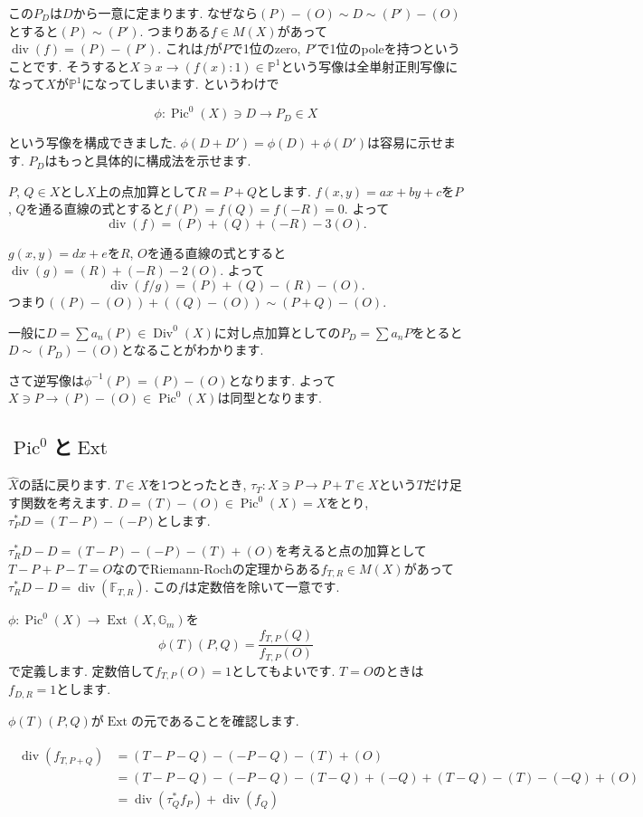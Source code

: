 \documentclass{jsarticle}
\newcommand{\FF}{\mathbb{F}}
\newcommand{\PP}{\mathbb{P}}
\newcommand{\GG}{\mathbb{G}}
\newcommand{\makeop}[1]{\mathop{\mathrm{#1}}\nolimits}
\def\Ext{\makeop{Ext}}
\def\Pic{\makeop{Pic}}
\def\Div{\makeop{Div}}
\def\div{\makeop{div}}
\theoremstyle{definition}
\numberwithin{theorem}{section}
\begin{document}
この$P_D$は$D$から一意に定まります. なぜなら$(P) - (O) \sim D \sim (P') - (O)$とすると$(P)\sim(P')$. つまりある$f\in M(X)$があって$\div(f) = (P) - (P')$. これは$f$が$P$で1位のzero, $P'$で1位のpoleを持つということです. そうすると$X \ni x \rightarrow (f(x):1) \in \PP^1$という写像は全単射正則写像になって$X$が$\PP^1$になってしまいます. というわけで

\begin{equation*}
\phi: \Pic^0(X) \ni D \rightarrow P_D \in X
\end{equation*}

という写像を構成できました. $\phi(D + D') = \phi(D) + \phi(D')$は容易に示せます. $P_D$はもっと具体的に構成法を示せます.

$P$, $Q \in X$とし$X$上の点加算として$R = P+Q$とします. $f(x, y) = ax+by+c$を$P$, $Q$を通る直線の式とすると$f(P) = f(Q) = f(-R) = 0$.
よって
\[
\div(f) = (P) + (Q) + (-R) - 3(O).
\]

$g(x, y) = dx+e$を$R$, $O$を通る直線の式とすると$\div(g) = (R) + (-R) - 2(O)$.
よって
\[
\div(f/g) = (P) + (Q) - (R) - (O).
\]
つまり$((P) - (O)) + ((Q) - (O)) \sim (P+Q) - (O)$.

一般に$D = \sum a_n(P) \in \Div^0(X)$に対し点加算としての$P_D = \sum a_n P$をとると$D \sim (P_D) - (O)$となることがわかります.

さて逆写像は$\phi^{-1}(P) = (P) - (O)$となります. よって$X \ni P \rightarrow (P) - (O) \in \Pic^0(X)$は同型となります.

\subsection{$\Pic^0$と$\Ext$}
$\hat{X}$の話に戻ります.
$T \in X$を1つとったとき, $\tau_T : X \ni P \rightarrow P+T \in X$という$T$だけ足す関数を考えます. $D = (T) - (O) \in \Pic^0(X) = X$をとり, $\tau_P^*D = (T-P) - (-P)$とします.

$\tau_R^*D - D = (T-P) - (-P) - (T) + (O)$を考えると点の加算として$T - P + P - T = O$なのでRiemann-Rochの定理からある$f_{T, R} \in M(X)$があって$\tau_R^*D - D = \div(\FF_{T, R})$.
この$f$は定数倍を除いて一意です.

$\phi: \Pic^0(X) \rightarrow \Ext(X, \GG_m)$を
\[
\phi(T)(P, Q) = \frac{f_{T, P}(Q)}{f_{T, P}(O)}
\]
で定義します. 定数倍して$f_{T, P}(O) = 1$としてもよいです. $T = O$のときは$f_{D, R} = 1$とします.

$\phi(T)(P, Q)$が$\Ext$の元であることを確認します.

\begin{eqnarray*}
\begin{aligned}
\div(f_{T, P+Q}) &= (T-P-Q) - (-P-Q) - (T) + (O)\\
&= (T-P-Q) - (-P-Q) - (T-Q) + (-Q) + (T-Q) - (T) - (-Q) + (O)\\
&= \div(\tau_Q^*f_P) + \div(f_Q)
\end{aligned}
\end{eqnarray*}
\end{document}
